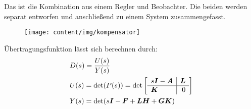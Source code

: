 
\begin{tcolorbox}[colback=white!10!white,colframe=green!30!black,title=Kompensator] 
Das ist die Kombination aus einem Regler und Beobachter. Die beiden werden separat entworfen und anschließend zu einem System zusammengefasst.
\begin{figure}[H]
\centering
\texttt{[image: content/img/kompensator]}
\caption{}
\label{fig:kompensator}
\end{figure}
Übertragungsfunktion lässt sich berechnen durch:
\begin{align*}
    &D(s) = \frac{U(s)}{Y(s)}\\
    &U(s) = \det(P(s)) = \det\left[\begin{array}{l|r}
    s\boldsymbol{I}- \boldsymbol{A} & \boldsymbol{L}\\\hline
    \boldsymbol{K} & 0
    \end{array}\right]\\
    &Y(s) = \det(s\boldsymbol{I}-\boldsymbol{F}+\boldsymbol{LH}+\boldsymbol{GK})
\end{align*} 

\end{tcolorbox}
